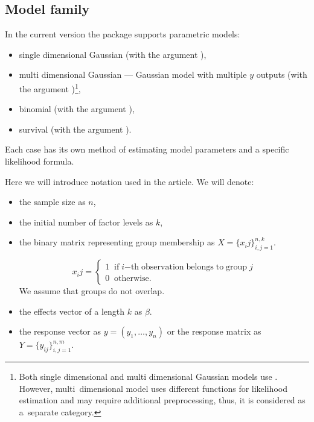 \subsection{Model family}

In the current version the package supports parametric models: 

\begin{itemize}
\item single dimensional Gaussian (with the argument ),
\item multi dimensional Gaussian --- Gaussian model with multiple $y$ outputs (with the argument )\footnote{Both single dimensional and multi dimensional Gaussian models use . However, multi~dimensional model uses different functions for likelihood estimation and may require additional preprocessing, thus, it is considered as a~separate category.},
\item binomial (with the argument ),
\item survival (with the argument ).
\end{itemize}

Each case has its own method of estimating model parameters and a specific likelihood formula.

Here we will introduce notation used in the article. We will denote:
\begin{itemize}

\item the sample size as $n$,
\item the initial number of factor levels as $k$,
\item the binary matrix representing group membership as $X = \{x_ij\}_{i,j=1}^{n,k}$. 

$$
x_ij = \left\{
                \begin{array}{ll}
                  1\;\; \mathrm{if} \; i \mathrm{-th \;
                  observation \; belongs \; to 
                  \; group\;} j \\
                  0 \;\; \mathrm{otherwise.} 
                \end{array}
       \right.$$
We assume that groups do not overlap.
\item the effects vector of a length $k$ as $\beta$.
\item the response vector as $y = (y_1, \ldots, y_n)$ or the response matrix as $Y = \{y_{ij}\}_{i,j=1}^{n,m}$.

\end{itemize}

